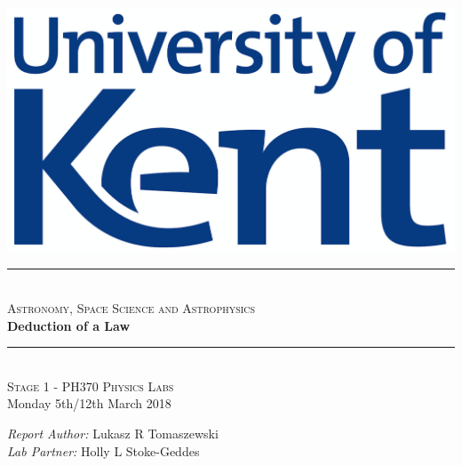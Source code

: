 \documentclass[12pt]{article}
\begin{document}
\begin{titlepage}

\newcommand{\HRule}{\rule{\linewidth}{0.5mm}}

\begin{centering} 
 

\includegraphics[scale=0.4]{Media/Uni_of_Kent_Logo.png}\\[1cm]


\HRule \\[0.4cm]
\textsc{\large Astronomy, Space Science and Astrophysics}\\[0.4cm]
{\huge \bfseries Deduction of a Law}\\[0.4cm]
\HRule \\[1.0cm]


\textsc{\Large Stage 1 - PH370 Physics Labs}\\[0.5cm] 
{\large Monday 5th/12th March 2018}\\[1.0cm]


\begin{minipage}{0.625\textwidth}
\centering

\emph{\large Report Author:} \large Lukasz R Tomaszewski \\ [0.2cm]
\emph{\large Lab Partner:} \large Holly L Stoke-Geddes \\

\end{minipage}\\[2cm]

\vfill
\end{centering} 
\end{titlepage}
\end{document}
